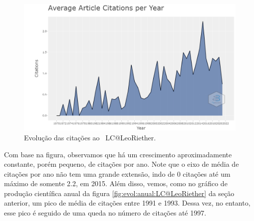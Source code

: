 \begin{figure}
    \centering
    \includegraphics[width=1\textwidth]{experiments/LeoRiether/AnaliseBibliometrica/LambdaCalculus/WoS-20220208/Images/AverageCitationsPerYear.png}
    \caption{Evolução das citações ao \dataset\   LC@LeoRiether.}
    \label{fig:evol:anual:citacoes:LC@LeoRiether}
\end{figure}

Com base na figura, observamos que há um crescimento aproximadamente constante, porém pequeno, de citações por ano. Note que o eixo de média de citações por ano não tem uma grande extensão, indo de 0 citações até um máximo de somente 2.2, em 2015. Além disso, vemos, como no gráfico de produção científica anual da figura \ref{fig:evol:anual:LC@LeoRiether} da seção anterior, um pico de média de citações entre 1991 e 1993. Dessa vez, no entanto, esse pico é seguido de uma queda no número de citações até 1997.
